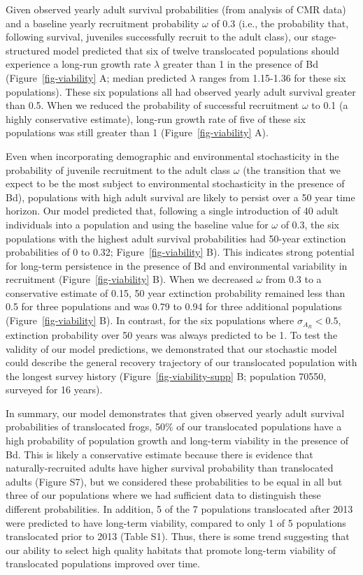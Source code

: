 \documentclass[9pt,twocolumn,twoside,lineno]{pnas-new}
\begin{document}
Given observed yearly adult survival probabilities (from analysis of CMR
data) and a baseline yearly recruitment probability \(\omega\) of 0.3
(i.e., the probability that, following survival, juveniles successfully
recruit to the adult class), our stage-structured model predicted that
six of twelve translocated populations should experience a long-run
growth rate \(\lambda\) greater than 1 in the presence of Bd
(Figure~\ref{fig-viability} A; median predicted \(\lambda\) ranges from
1.15-1.36 for these six populations). These six populations all had
observed yearly adult survival greater than 0.5. When we reduced the
probability of successful recruitment \(\omega\) to 0.1 (a highly
conservative estimate), long-run growth rate of five of these six
populations was still greater than 1 (Figure~\ref{fig-viability} A).

Even when incorporating demographic and environmental stochasticity in
the probability of juvenile recruitment to the adult class \(\omega\)
(the transition that we expect to be the most subject to environmental
stochasticity in the presence of Bd), populations with high adult
survival are likely to persist over a 50 year time horizon. Our model
predicted that, following a single introduction of 40 adult individuals
into a population and using the baseline value for \(\omega\) of 0.3,
the six populations with the highest adult survival probabilities had
50-year extinction probabilities of 0 to 0.32;
Figure~\ref{fig-viability} B). This indicates strong potential for
long-term persistence in the presence of Bd and environmental
variability in recruitment (Figure~\ref{fig-viability} B). When we
decreased \(\omega\) from 0.3 to a conservative estimate of 0.15, 50
year extinction probability remained less than 0.5 for three populations
and was 0.79 to 0.94 for three additional populations
(Figure~\ref{fig-viability} B). In contrast, for the six populations
where \(\sigma_{A_R} < 0.5\), extinction probability over 50 years was
always predicted to be 1. To test the validity of our model predictions,
we demonstrated that our stochastic model could describe the general
recovery trajectory of our translocated population with the longest
survey history (Figure~\ref{fig-viability-supp} B; population 70550,
surveyed for 16 years).

In summary, our model demonstrates that given observed yearly adult
survival probabilities of translocated frogs, 50\% of our translocated
populations have a high probability of population growth and long-term
viability in the presence of Bd. This is likely a conservative estimate
because there is evidence that naturally-recruited adults have higher
survival probability than translocated adults
(Figure S7), but we considered these
probabilities to be equal in all but three of our populations where we
had sufficient data to distinguish these different probabilities. In
addition, 5 of the 7 populations translocated after 2013 were predicted
to have long-term viability, compared to only 1 of 5 populations
translocated prior to 2013 (Table S1). Thus,
there is some trend suggesting that our ability to select high quality
habitats that promote long-term viability of translocated populations
improved over time.
\end{document}
